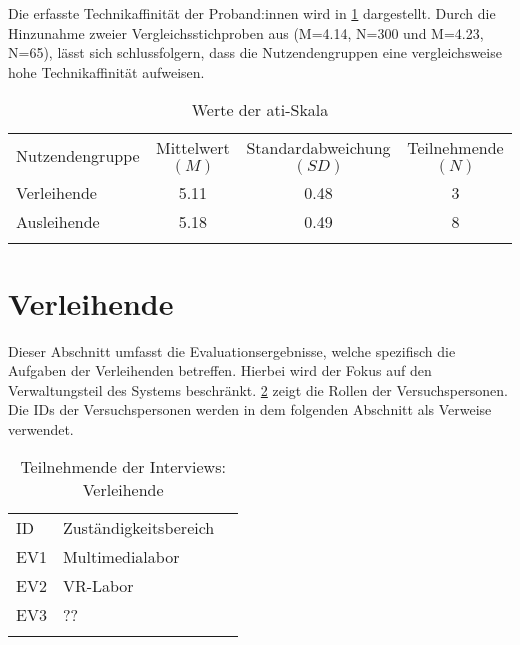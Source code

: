 Die erfasste Technikaffinität der Proband:innen wird in \ref{table:atipartzwei} dargestellt. Durch
die Hinzunahme zweier Vergleichsstichproben aus  (M=4.14, N=300 und
M=4.23, N=65), lässt sich schlussfolgern, dass die Nutzendengruppen eine vergleichsweise hohe
Technikaffinität aufweisen.

\begin{table}[h]
  \centering
  \caption{Werte der \ac{ati}-Skala}
  \begin{tabular}{lccc}
    \arrayrulecolor{maincolor}\hline
    \sffamily\color{maincolor}Nutzendengruppe            &
    \sffamily\color{maincolor}Mittelwert $(M)$          &
    \sffamily\color{maincolor}Standardabweichung $(SD)$ &
    \sffamily\color{maincolor}Teilnehmende $(N)$                        \\
    \arrayrulecolor{maincolor}\hline
    Verleihende                                         & 5.11 & 0.48 & 3 \\
    Ausleihende                                         & 5.18 & 0.49 & 8 \\
    \arrayrulecolor{maincolor}\hline
  \end{tabular}
  \label{table:atipartzwei}
\end{table}

\section{Verleihende}
\label{sec:ev-ver}
Dieser Abschnitt umfasst die Evaluationsergebnisse, welche spezifisch die Aufgaben der Verleihenden
betreffen. Hierbei wird der Fokus auf den Verwaltungsteil des Systems beschränkt. \ref{table:vzwei}
zeigt die Rollen der Versuchspersonen. Die IDs der Versuchspersonen werden in dem folgenden
Abschnitt als Verweise verwendet.

\begin{table}[h]
  \centering
  \caption{Teilnehmende der Interviews: Verleihende}
  \begin{tabular}{lll}
    \arrayrulecolor{maincolor}\hline
    \sffamily\color{maincolor}ID &
    \sffamily\color{maincolor}Zuständigkeitsbereich \\
    \arrayrulecolor{maincolor}\hline
    EV1                         & Multimedialabor  \\
    EV2                         & VR-Labor         \\
    EV3                         & ??               \\
    \arrayrulecolor{maincolor}\hline
  \end{tabular}
  \label{table:vzwei}
\end{table}

